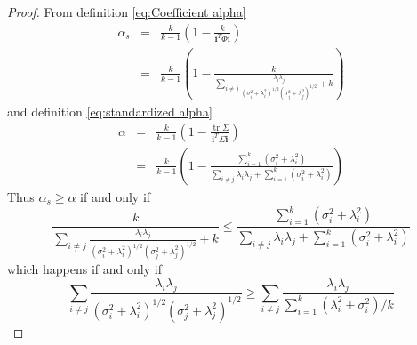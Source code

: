 \documentclass[twoside]{article}
\DeclareMathOperator{\tr}{tr}
\renewcommand{\sqrt}[1]{{(#1)^{1/2}}}
\begin{document}
\begin{proof}
From definition \eqref{eq:Coefficient alpha}
\begin{eqnarray*}
\alpha_{s} & = & \frac{k}{k-1}\left(1-\frac{k}{\mathbf{i}^{T}\Phi\mathbf{i}}\right)\\
 & = & \frac{k}{k-1}\left(1-\frac{k}{\sum_{i\neq j}\frac{\lambda_{i}\lambda_{j}}{\sqrt{\sigma_{i}^{2}+\lambda_{i}^{2}}\sqrt{\sigma_{j}^{2}+\lambda_{j}^{2}}}+k}\right)
\end{eqnarray*}
and definition \eqref{eq:standardized alpha}
\begin{eqnarray*}
\alpha & = & \frac{k}{k-1}\left(1-\frac{\tr\Sigma}{\mathbf{i}^{T}\Sigma\mathbf{i}}\right)\\
 & = & \frac{k}{k-1}\left(1-\frac{\sum_{i=1}^{k}\left(\sigma_{i}^{2}+\lambda_{i}^{2}\right)}{\sum_{i\neq j}\lambda_{i}\lambda_{j}+\sum_{i=1}^{k}\left(\sigma_{i}^{2}+\lambda_{i}^{2}\right)}\right)
\end{eqnarray*}
Thus $\alpha_{s}\geq\alpha$ if and only if
\[
\frac{k}{\sum_{i\neq j}\frac{\lambda_{i}\lambda_{j}}{\sqrt{\sigma_{i}^{2}+\lambda_{i}^{2}}\sqrt{\sigma_{j}^{2}+\lambda_{j}^{2}}}+k}\leq\frac{\sum_{i=1}^{k}\left(\sigma_{i}^{2}+\lambda_{i}^{2}\right)}{\sum_{i\neq j}\lambda_{i}\lambda_{j}+\sum_{i=1}^{k}\left(\sigma_{i}^{2}+\lambda_{i}^{2}\right)}
\]
which happens if and only if 
\[
\sum_{i\neq j}\frac{\lambda_{i}\lambda_{j}}{\sqrt{\sigma_{i}^{2}+\lambda_{i}^{2}}\sqrt{\sigma_j^{2}+\lambda_{j}^{2}}}\geq\sum_{i\neq j}\frac{\lambda_{i}\lambda_{j}}{\sum_{i=1}^{k}\left(\lambda_{i}^{2}+\sigma_{i}^{2}\right)/k}
\]
\end{proof}
\end{document}
